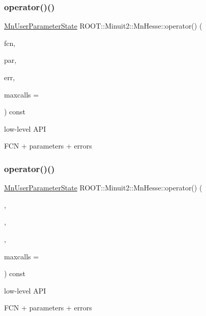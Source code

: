 \subsubsection{\texorpdfstring{operator()()}{operator()()}\hspace{0.1cm}{\footnotesize\ttfamily [1/24]}}
{\footnotesize\ttfamily \mbox{\hyperlink{classROOT_1_1Minuit2_1_1MnUserParameterState}{Mn\+User\+Parameter\+State}} R\+O\+O\+T\+::\+Minuit2\+::\+Mn\+Hesse\+::operator() (\begin{DoxyParamCaption}\item[{const \mbox{\hyperlink{classROOT_1_1Minuit2_1_1FCNBase}{F\+C\+N\+Base}} \&}]{fcn,  }\item[{const std\+::vector$<$ double $>$ \&}]{par,  }\item[{const std\+::vector$<$ double $>$ \&}]{err,  }\item[{unsigned int}]{maxcalls = {} }\end{DoxyParamCaption}) const}

low-\/level A\+PI

F\+CN + parameters + errors \mbox{\label{classROOT_1_1Minuit2_1_1MnHesse_aa0af93c1c82038bab7ffe84c198fa176}} 
\subsubsection{\texorpdfstring{operator()()}{operator()()}\hspace{0.1cm}{\footnotesize\ttfamily [2/24]}}
{\footnotesize\ttfamily \mbox{\hyperlink{classROOT_1_1Minuit2_1_1MnUserParameterState}{Mn\+User\+Parameter\+State}} R\+O\+O\+T\+::\+Minuit2\+::\+Mn\+Hesse\+::operator() (\begin{DoxyParamCaption}\item[{const \mbox{\hyperlink{classROOT_1_1Minuit2_1_1FCNBase}{F\+C\+N\+Base}} \&}]{,  }\item[{const std\+::vector$<$ double $>$ \&}]{,  }\item[{const std\+::vector$<$ double $>$ \&}]{,  }\item[{unsigned int}]{maxcalls = {} }\end{DoxyParamCaption}) const}

low-\/level A\+PI

F\+CN + parameters + errors \mbox{\label{classROOT_1_1Minuit2_1_1MnHesse_aa0af93c1c82038bab7ffe84c198fa176}} 
